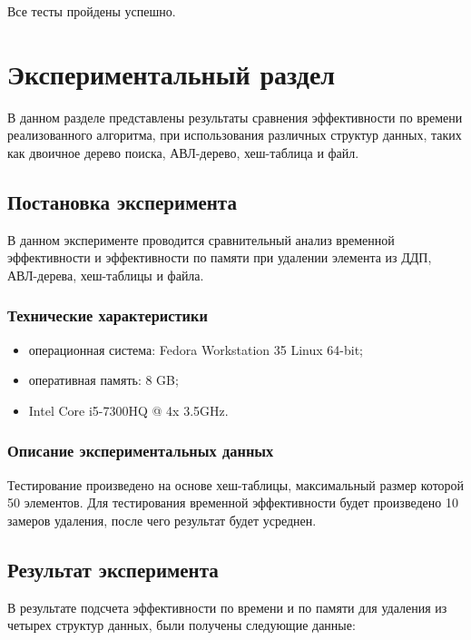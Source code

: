 Все тесты пройдены успешно.

\chapter{Экспериментальный раздел}

В данном разделе представлены результаты сравнения эффективности по времени реализованного алгоритма, при использования различных структур данных, таких как двоичное дерево поиска, АВЛ-дерево, хеш-таблица и файл.

\section{Постановка эксперимента}

В данном эксперименте проводится сравнительный анализ временной эффективности и эффективности по памяти при удалении элемента из ДДП, АВЛ-дерева, хеш-таблицы и файла.

\subsection{Технические характеристики}

\begin{itemize}[$\bullet$]
    \item операционная система: Fedora Workstation 35 Linux 64-bit;
    \item оперативная память: 8 GB;
    \item Intel Core i5-7300HQ @ 4x 3.5GHz.
\end{itemize}

\subsection{Описание экспериментальных данных}

Тестирование произведено на основе хеш-таблицы, максимальный размер которой 50 элементов. Для тестирования временной эффективности будет произведено 10 замеров удаления, после чего результат будет усреднен.

\clearpage

\section{Результат эксперимента}

В результате подсчета эффективности по времени и по памяти для удаления из четырех структур данных, были получены следующие данные:

